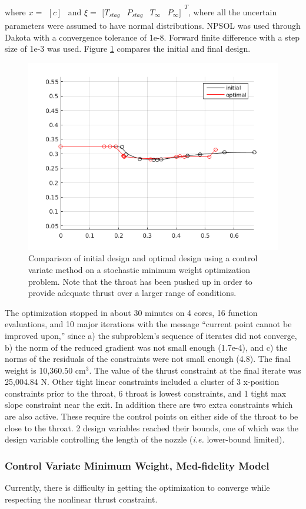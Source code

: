 \documentclass{article}
\newcommand{\irow}[1]{%
  \begin{smallmatrix}[#1]\end{smallmatrix}%
}
\begin{document}
where $x = \irow{c}$ and $\xi = \irow{ T_{stag} & P_{stag} & T_{\infty} & P_{\infty} }^T$, where all the uncertain parameters were assumed to have normal distributions. NPSOL was used through Dakota with a convergence tolerance of 1e-8. Forward finite difference with a step size of 1e-3 was used. Figure \ref{fig:minWeightLofiCVSimpleResults} compares the initial and final design.

\begin{figure}
\caption{Comparison of initial design and optimal design using a control variate method on a stochastic minimum weight optimization problem. Note that the throat has been pushed up in order to provide adequate thrust over a larger range of conditions.}
\label{fig:minWeightLofiCVSimpleResults}
\begin{center}
\includegraphics[scale=0.5]{figs/cv_lowfi_result.png}
\end{center}
\end{figure}

The optimization stopped in about 30 minutes on 4 cores, 16 function evaluations, and 10 major iterations with the message ``current point cannot be improved upon,'' since a) the subproblem's sequence of iterates did not converge, b) the norm of the reduced gradient was not small enough (1.7e-4), and c) the norms of the residuals of the constraints were not small enough (4.8). The final weight is 10,360.50 $\textrm{cm}^3$. The value of the thrust constraint at the final iterate was 25,004.84 N. Other tight linear constraints included a cluster of 3 x-position constraints prior to the throat, 6 throat is lowest constraints, and 1 tight max slope constraint near the exit. In addition there are two extra constraints which are also active. These require the control points on either side of the throat to be close to the throat. 2 design variables reached their bounds, one of which was the design variable controlling the length of the nozzle (\textit{i.e.} lower-bound limited).

\subsubsection{Control Variate Minimum Weight, Med-fidelity Model}

Currently, there is difficulty in getting the optimization to converge while respecting the nonlinear thrust constraint.
\end{document}
